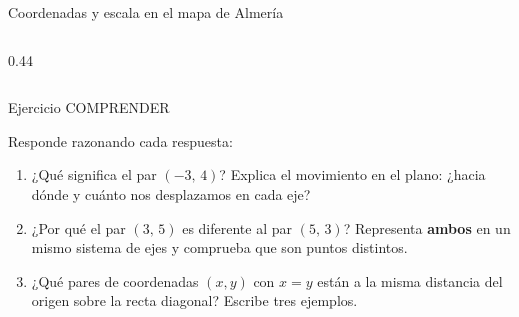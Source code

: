 \documentclass[aspectratio=169, 10pt, spanish]{beamer}
\begin{document}
\begin{frame}{Coordenadas y escala en el mapa de Almería}
\begin{columns}[c]
\begin{column}{0.44\textwidth}
\begin{center}
      \end{center}
    \end{column}
  \end{columns}
\end{frame}


\begin{frame}{Ejercicio COMPRENDER}
  \quad{}
  \vspace{4pt}
  \begin{comprenderbox}
    \AlmFontSmall
    Responde razonando cada respuesta:
    \begin{enumerate}
      \item ¿Qué significa el par $(-3,\,4)$?
            Explica el movimiento en el plano:
            ¿hacia dónde y cuánto nos desplazamos en cada eje?
      \item ¿Por qué el par $(3,\,5)$ es diferente al par $(5,\,3)$?
            Representa \textbf{ambos} en un mismo sistema de ejes
            y comprueba que son puntos distintos.
      \item ¿Qué pares de coordenadas $(x, y)$ con $x = y$
            están a la misma distancia del origen
            sobre la recta diagonal?
            Escribe tres ejemplos.
    \end{enumerate}
  \end{comprenderbox}
\end{frame}
\end{document}
